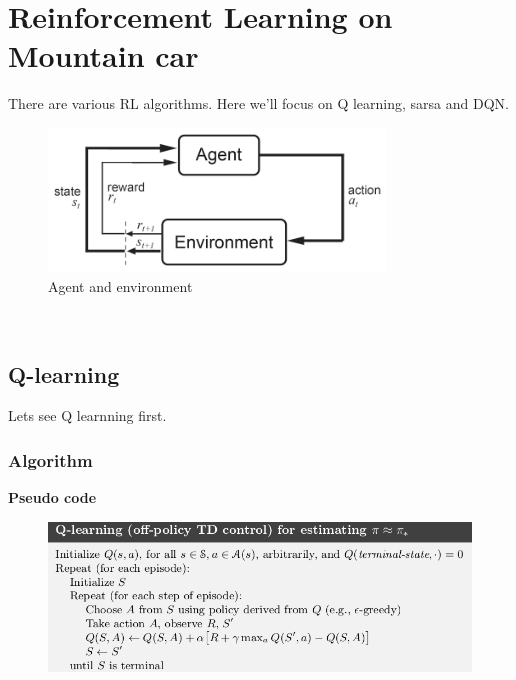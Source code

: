 \chapter{Reinforcement Learning on Mountain car}

There are various RL algorithms. Here we'll focus on Q learning, sarsa and DQN.\\
\begin{figure}[H]
    \centering
    \includegraphics[width=0.8\textwidth]{images/qlearn.png}
    \caption{Agent and environment}
\end{figure}\\



\section{Q-learning}
Lets see Q learnning first.
\subsection{Algorithm}
\newline \textbf{Pseudo code}
\begin{figure}[H]
    \centering
    \includegraphics[width=\textwidth]{images/qlearnpseudo.png}
\end{figure}


